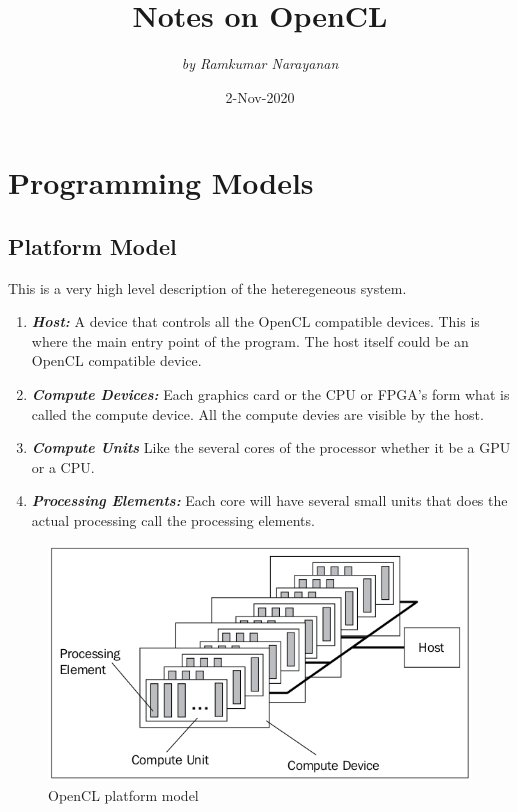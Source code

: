 \documentclass[10pt]{article}
\begin{document}
 
\title{\Huge \bsifamily Notes on OpenCL}
\author{\textit{by Ramkumar Narayanan}}
\date{}
\maketitle 
\tableofcontents
\newpage

{\color{red} \date{2-Nov-2020}}
\Large
\section{Programming Models}
\subsection{Platform Model}
This is a very high level description of the heteregeneous system. 
\begin{enumerate}
	\item \textbf{\textit{Host:}} A device that controls all the OpenCL compatible devices. This is where the main entry point of the program. The host itself could be an OpenCL compatible device.
	\item \textbf{\textit{Compute Devices:}} Each graphics card or the CPU or FPGA's form what is called the compute device. All the compute devies are visible by the host.
	\item \textbf{\textit{Compute Units}} Like the several cores of the processor whether it be a GPU or a CPU. 
	\item \textbf{\textit{Processing Elements:}} Each core will have several small units that does the actual processing call the processing elements.
\end{enumerate}

\begin{figure}[ht]
  \centering
  \includegraphics[scale=0.4]{./images/platform_model.png}
  \caption{OpenCL platform model}
  \label{platform_model}
\end{figure}
\end{document}
